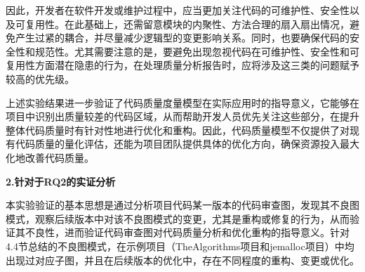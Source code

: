 因此，开发者在软件开发或维护过程中，应当更加关注代码的可维护性、安全性以及可复用性。在此基础上，还需留意模块的内聚性、方法合理的扇入扇出情况，避免产生过紧的耦合，并尽量减少逻辑型的变更影响关系。同时，也要确保代码的安全性和规范性。尤其需要注意的是，要避免出现忽视代码在可维护性、安全性和可复用性方面潜在隐患的行为，在处理质量分析报告时，应将涉及这三类的问题赋予较高的优先级。

上述实验结果进一步验证了代码质量度量模型在实际应用时的指导意义，它能够在项目中识别出质量较差的代码区域，从而帮助开发人员优先关注这些部分，在提升整体代码质量时有针对性地进行优化和重构。因此，代码质量模型不仅提供了对现有代码质量的量化评估，还能为项目团队提供具体的优化方向，确保资源投入最大化地改善代码质量。

\textbf{2.针对于RQ2的实证分析}

本实验验证的基本思想是通过分析项目代码某一版本的代码审查图，发现其不良图模式，观察后续版本中对该不良图模式的变更，尤其是重构或修复的行为，从而验证其不良性，进而验证代码审查图对代码质量分析和优化重构的指导意义。针对4.4节总结的不良图模式，在示例项目（TheAlgorithms项目和jemalloc项目）中均出现过对应子图，并且在后续版本的优化中，存在不同程度的重构、变更或优化。


